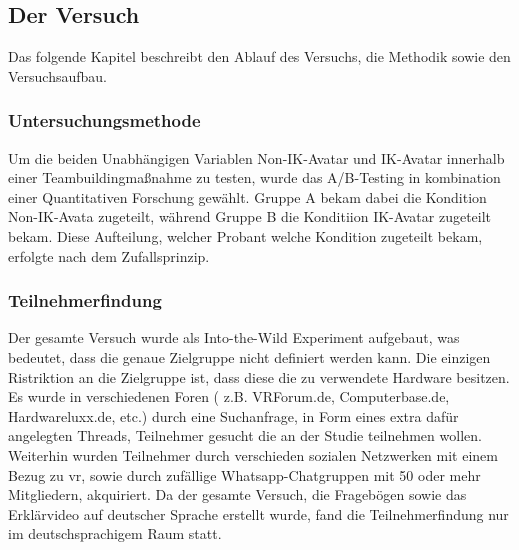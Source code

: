 \documentclass[a4paper,11pt]{article}%
\renewcommand{\\}{\vspace*{0.5\baselineskip} \newline}
\begin{document}
\subsection{Der Versuch}
	
Das folgende Kapitel beschreibt den Ablauf des Versuchs, die Methodik sowie den Versuchsaufbau.

\subsubsection{Untersuchungsmethode}
Um die beiden Unabhängigen Variablen \dq{}Non-IK-Avatar\dq{} und \dq{}IK-Avatar\dq{} innerhalb einer Teambuildingmaßnahme zu testen, wurde das A/B-Testing in kombination einer Quantitativen Forschung gewählt.
Gruppe A bekam dabei die Kondition \dq{}Non-IK-Avata\dq{} zugeteilt, während Gruppe B die Konditiion \dq{}IK-Avatar\dq{} zugeteilt bekam. Diese Aufteilung, welcher Probant welche Kondition zugeteilt bekam, erfolgte nach dem Zufallsprinzip. 

	\subsubsection{Teilnehmerfindung}
Der gesamte Versuch wurde als Into-the-Wild Experiment aufgebaut, was bedeutet, dass die genaue Zielgruppe nicht definiert werden kann. Die einzigen Ristriktion an die Zielgruppe ist, dass diese die zu verwendete Hardware besitzen. Es wurde in verschiedenen Foren ( z.B. VRForum.de, Computerbase.de, Hardwareluxx.de, etc.) durch eine Suchanfrage, in Form eines extra dafür angelegten Threads, Teilnehmer gesucht die an der Studie teilnehmen wollen. Weiterhin wurden Teilnehmer durch verschieden sozialen Netzwerken mit einem Bezug zu \ac{vr}, sowie durch zufällige Whatsapp-Chatgruppen mit 50 oder mehr Mitgliedern, akquiriert. Da der gesamte Versuch, die Fragebögen sowie das Erklärvideo auf deutscher Sprache erstellt wurde, fand die Teilnehmerfindung nur im deutschsprachigem Raum statt.
\end{document}
